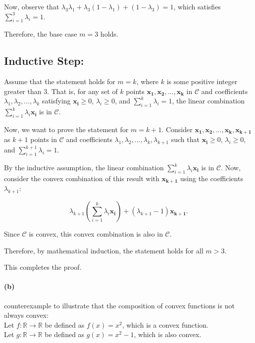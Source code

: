 \documentclass[12pt]{article}
\begin{document}
Now, observe that $\lambda_3 \lambda_1 + \lambda_3 (1 - \lambda_1) + (1 - \lambda_3) = 1$, which satisfies $\sum_{i=1}^{3} \lambda_i = 1$.

Therefore, the base case $m = 3$ holds.
\subsection*{Inductive Step:}

Assume that the statement holds for $m = k$, where $k$ is some positive integer greater than $3$. That is, for any set of $k$ points $\mathbf{x_1, x_2, \ldots, x_k}$ in $\mathcal{C}$ and coefficients $\lambda_1, \lambda_2, \ldots, \lambda_k$ satisfying $\mathbf{x_i} \geq 0$, $\lambda_i \geq 0$, and $\sum_{i=1}^{k} \lambda_i = 1$, the linear combination $\sum_{i=1}^{k} \lambda_i \mathbf{x_i}$ is in $\mathcal{C}$.

Now, we want to prove the statement for $m = k + 1$. Consider $\mathbf{x_1, x_2, \ldots, x_k, x_{k+1}}$ as $k + 1$ points in $\mathcal{C}$ and coefficients $\lambda_1, \lambda_2, \ldots, \lambda_k, \lambda_{k+1}$ such that $\mathbf{x_i} \geq 0$, $\lambda_i \geq 0$, and $\sum_{i=1}^{k+1} \lambda_i = 1$.

By the inductive assumption, the linear combination $\sum_{i=1}^{k} \lambda_i \mathbf{x_i}$ is in $\mathcal{C}$. Now, consider the convex combination of this result with $\mathbf{x_{k+1}}$ using the coefficients $\lambda_{k+1}$:

\[
\lambda_{k+1} \left(\sum_{i=1}^{k} \lambda_i \mathbf{x_i}\right) + (\lambda_{k+1}-1) \mathbf{x_{k+1}}.
\]

Since $\mathcal{C}$ is convex, this convex combination is also in $\mathcal{C}$.

Therefore, by mathematical induction, the statement holds for all $m > 3$.

This completes the proof.


\paragraph{(b)}
counterexample to illustrate that the composition of convex functions is not always convex: \\

Let \( f: \mathbb{R} \rightarrow \mathbb{R} \) be defined as \( f(x) = x^2 \), which is a convex function. \\

Let \( g: \mathbb{R} \rightarrow \mathbb{R} \) be defined as \( g(x) = x^2-1 \), which is also convex. \\
\end{document}
